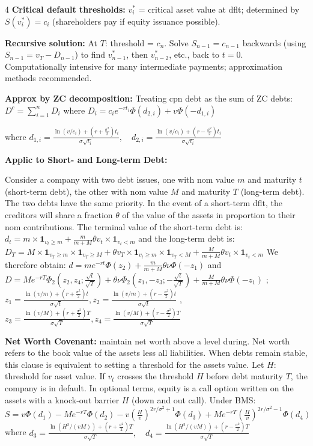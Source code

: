 \documentclass[landscape]{article}
\begin{document}
\begin{multicols}{4}
\textbf{Critical default thresholds:} $v_i^*$ = critical asset value at dflt; determined by $S(v_i^*) = c_i$ (shareholders pay if equity issuance possible).

\textbf{Recursive solution:} At $T$: threshold = $c_n$. Solve $S_{n-1} = c_{n-1}$ backwards (using $S_{n-1} = v_T - D_{n-1}$) to find $v_{n-1}^*$, then $v_{n-2}^*$, etc., back to $t=0$. Computationally intensive for many intermediate payments; approximation methods recommended.

\textbf{Approx by ZC decomposition:} Treating cpn debt as the sum of ZC debts: $D^c = \sum_{i=1}^{n} D_i$ where $D_i = c_i e^{-rt_i}\Phi(d_{2,i}) + v\Phi(-d_{1,i})$

where $d_{1,i} = \frac{\ln(v/c_i) + (r + \frac{\sigma^2}{2})t_i}{\sigma\sqrt{t_i}}, \quad d_{2,i} = \frac{\ln(v/c_i) + (r - \frac{\sigma^2}{2})t_i}{\sigma\sqrt{t_i}}$

\textbf{Applic to Short- and Long-term Debt:}

Consider a company with two debt issues, one with nom value $m$ and maturity $t$ (short-term debt), the other with nom value $M$ and maturity $T$ (long-term debt). The two debts have the same priority. In the event of a short-term dflt, the creditors will share a fraction $\theta$ of the value of the assets in proportion to their nom contributions. The terminal value of the short-term debt is: $d_t = m \times \mathbf{1}_{v_t \geq m} + \frac{m}{m+M} \theta v_t \times \mathbf{1}_{v_t < m}$ and the long-term debt is: $D_T = M \times \mathbf{1}_{v_T \geq m} \times \mathbf{1}_{v_T \geq M} + \theta v_T \times \mathbf{1}_{v_t \geq m} \times \mathbf{1}_{v_T < M} + \frac{M}{m+M} \theta v_t \times \mathbf{1}_{v_t < m}$
We therefore obtain: $d = me^{-rt}\Phi(z_2) + \frac{m}{m+M} \theta \nu \Phi(-z_1)$ and $D = Me^{-rT}\Phi_2\left(z_2, z_4; \frac{\sqrt{t}}{\sqrt{T}}\right) + \theta \nu \Phi_2\left(z_1, -z_3; -\frac{\sqrt{t}}{\sqrt{T}}\right) + \frac{M}{m+M} \theta \nu \Phi(-z_1)$ ; $z_1 = \frac{\ln(v/m) + (r + \frac{\sigma^2}{2})t}{\sigma\sqrt{t}}, z_2 = \frac{\ln(v/m) + (r - \frac{\sigma^2}{2})t}{\sigma\sqrt{t}}$ , $z_3 = \frac{\ln(v/M) + (r + \frac{\sigma^2}{2})T}{\sigma\sqrt{T}}, z_4 = \frac{\ln(v/M) + (r - \frac{\sigma^2}{2})T}{\sigma\sqrt{T}}$

\textcolor{subsubsectioncolor}{\textbf{Net Worth Covenant:}}  maintain net worth above a level during. Net worth refers to the book value of the assets less all liabilities. When debts remain stable, this clause is equivalent to setting a threshold for the assets value. 
Let $H$: threshold for asset value. If $v_t$ crosses the threshold $H$ before debt maturity $T$, the company is in default. In optional terms, equity is a call option written on the assets with a knock-out barrier $H$ (down and out call).
Under BMS: $S = v\Phi(d_1) - Me^{-rT}\Phi(d_2) - v\left(\frac{H}{v}\right)^{2r/\sigma^2 + 1}\Phi(d_3) + Me^{-rT}\left(\frac{H}{v}\right)^{2r/\sigma^2 - 1}\Phi(d_4)$ where $d_3 = \frac{\ln(H^2/(vM)) + (r + \frac{\sigma^2}{2})T}{\sigma\sqrt{T}}, \quad d_4 = \frac{\ln(H^2/(vM)) + (r - \frac{\sigma^2}{2})T}{\sigma\sqrt{T}}$


\end{multicols}
\end{document}
